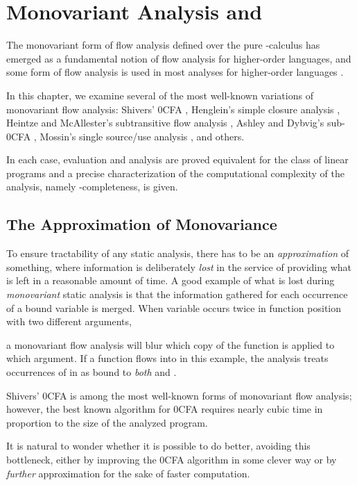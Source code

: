 \chapter{Monovariant Analysis and \ptime}
\label{chapter-0cfa}

The monovariant form of flow analysis defined over the pure
-calculus has emerged as a fundamental notion of flow
analysis for higher-order languages, and some form of flow analysis is
used in most analyses for higher-order languages
\cite{heintze-mcallester-pldi97}.

In this chapter, we examine several of the most well-known variations
of monovariant flow analysis: Shivers' 0CFA
\citeyearpar{shivers-pldi88}, Henglein's simple closure analysis
\citeyearpar{henglein92d}, Heintze and McAllester's subtransitive flow
analysis \citeyearpar{heintze-mcallester-pldi97}, Ashley and Dybvig's
sub-0CFA \citeyearpar{ashley-dybvig-toplas98}, Mossin's single
source/use analysis \citeyearpar{mossin-njc98}, and others.

In each case, evaluation and analysis are proved equivalent for the
class of linear programs and a precise characterization of the
computational complexity of the analysis, namely \ptime-completeness,
is given.

\section{The Approximation of Monovariance}

To ensure tractability of any static analysis, there has to be an {\em
  approximation} of something, where information is deliberately {\em
  lost} in the service of providing what is left in a reasonable
amount of time.  A good example of what is lost during {\em
  monovariant} static analysis is that the information gathered for
each occurrence of a bound variable is merged.  When variable 
occurs twice in function position with two different arguments,

a monovariant flow analysis will blur which copy of the function is
applied to which argument.  If a function  flows into 
in this example, the analysis treats occurrences of  in  as
bound to {\em both}  and
. 

Shivers' 0CFA is among the most well-known forms of monovariant flow
analysis; however, the best known algorithm for 0CFA requires nearly
cubic time in proportion to the size of the analyzed program.

It is natural to wonder whether it is possible to do better, avoiding
this bottleneck, either by improving the 0CFA algorithm in some clever
way or by {\em further} approximation for the sake of faster
computation.

